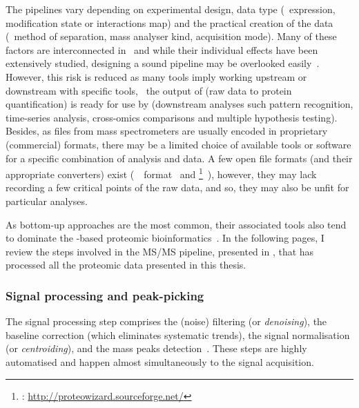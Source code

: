 The pipelines vary depending on experimental design, data type
(\ie\ expression, modification state or interactions map)
and the practical creation of the data (\eg\ method of separation,
mass analyser kind, acquisition mode).
Many of these factors are interconnected in \ms\
and while their individual effects have been extensively studied,
designing a sound pipeline may be overlooked easily~.
However,
this risk is reduced as
many tools imply working upstream or downstream with specific tools,
\eg\ the output of \soft{MaxQuant} (raw data to protein quantification) is
ready for use by 
(downstream analyses such pattern recognition,
time-series analysis, cross-omics comparisons and multiple hypothesis testing).
Besides, as files from mass spectrometers are usually encoded
in proprietary (commercial) formats,
there may be a limited choice of available tools or software
for a specific combination of analysis and data.
A few open file formats (and their appropriate converters) exist
(\eg\ \mzml\ format~\mycite{mzML}
and \href{http://proteowizard.sourceforge.net/}{}\footnote{%
\soft{ProteoWizard}: \href{http://proteowizard.sourceforge.net/}%
{http://proteowizard.sourceforge.net/}}~\mycite{proteowizard2012}),
however, they may lack recording a few critical points of the raw data,
and so, they may also be unfit for particular analyses.\mybr\

As bottom-up approaches are the most common,
their associated tools also tend to dominate
the \ms{}-based proteomic bioinformatics~.
In the following pages,
I review the steps involved in the \gls{MS/MS} pipeline,
presented in ,
that has processed all the proteomic data presented in this thesis.\mybr\

\subsubsection{Signal processing and peak-picking}

The signal processing step comprises
the (noise) filtering (or \emph{denoising}),
the baseline correction (which eliminates systematic trends),
the signal normalisation (or \emph{centroiding}),
and the mass peaks detection~.
These steps are highly automatised and
happen almost simultaneously to the signal acquisition.\mybr\

